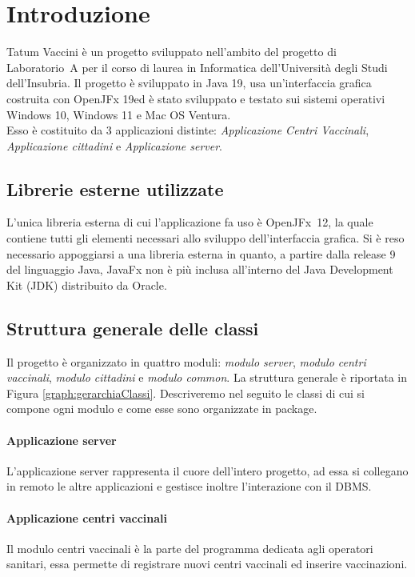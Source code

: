 \section{Introduzione}

	Tatum Vaccini è un progetto sviluppato nell'ambito del progetto di Laboratorio~A per il corso di laurea in Informatica dell'Università degli Studi dell'Insubria.
	Il progetto è sviluppato in Java 19, usa un’interfaccia grafica costruita con OpenJFx 19ed è stato sviluppato e testato sui sistemi operativi Windows 10, Windows 11 e Mac OS Ventura.\\
	Esso è costituito da 3 applicazioni distinte: \emph{Applicazione Centri Vaccinali}, \emph{Applicazione cittadini} e \emph{Applicazione server}.
	
\subsection{Librerie esterne utilizzate}
	L'unica libreria esterna di cui l'applicazione fa uso è OpenJFx~12, la quale contiene tutti gli elementi necessari allo sviluppo dell'interfaccia grafica.
	Si è reso necessario appoggiarsi a una libreria esterna in quanto, a partire dalla release 9 del linguaggio Java, JavaFx non è più inclusa all'interno del Java Development Kit (JDK) distribuito da Oracle.
	
\subsection{Struttura generale delle classi}
	Il progetto è organizzato in quattro moduli: \emph{modulo server}, \emph{modulo centri vaccinali}, \emph{modulo cittadini} e \emph{modulo common}.
	La struttura generale è riportata in Figura \ref*{graph:gerarchiaClassi}.
	Descriveremo nel seguito le classi di cui si compone ogni modulo e come esse sono organizzate in package.
	
	
	
	\paragraph{Applicazione server}
	L'applicazione server rappresenta il cuore dell'intero progetto, ad essa si collegano in remoto le altre applicazioni e gestisce inoltre l'interazione con il DBMS.
	
	
	\paragraph{Applicazione centri vaccinali}
	Il modulo centri vaccinali è la parte del programma dedicata agli operatori sanitari, essa permette di registrare nuovi centri vaccinali ed inserire vaccinazioni.


